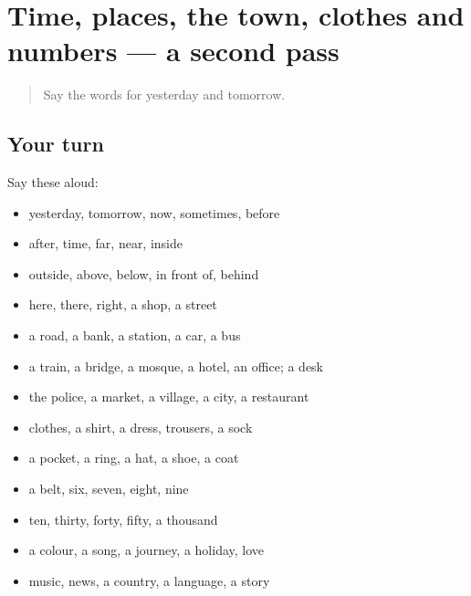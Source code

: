 \section[(dialogue)]{Time, places, the town, clothes and numbers — a second pass}

\label{lesson:AR-R99-second-pass-time-places-the-town-clothes-and-numbers}



\begin{quote}
Say the words for yesterday and tomorrow.
\end{quote}

\subsection*{Your turn}
Say these aloud:

\begin{itemize}
\raggedright
  \item yesterday, tomorrow, now, sometimes, before
  \item after, time, far, near, inside
  \item outside, above, below, in front of, behind
  \item here, there, right, a shop, a street
  \item a road, a bank, a station, a car, a bus
  \item a train, a bridge, a mosque, a hotel, an office; a desk
  \item the police, a market, a village, a city, a restaurant
  \item clothes, a shirt, a dress, trousers, a sock
  \item a pocket, a ring, a hat, a shoe, a coat
  \item a belt, six, seven, eight, nine
  \item ten, thirty, forty, fifty, a thousand
  \item a colour, a song, a journey, a holiday, love
  \item music, news, a country, a language, a story
\end{itemize}

